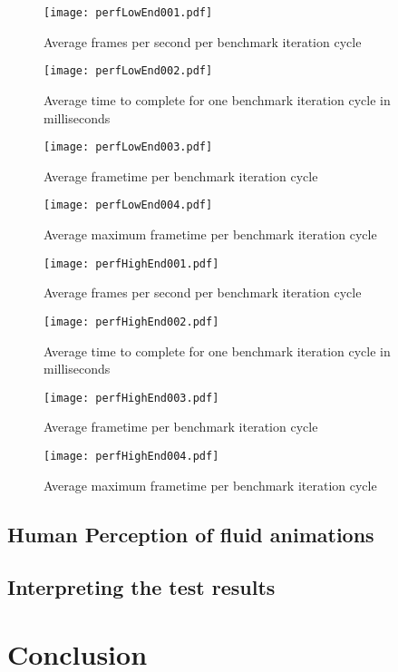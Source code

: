 \begin{figure}
\centering
\texttt{[image: perfLowEnd001.pdf]}
\caption{Average frames per second per benchmark iteration cycle}
\label{fig:perfLowEnd001}
\end{figure}

\begin{figure}
\centering
\texttt{[image: perfLowEnd002.pdf]}
\caption{Average time to complete for one benchmark iteration cycle in milliseconds}
\label{fig:perfLowEnd002}
\end{figure}

\begin{figure}
\centering
\texttt{[image: perfLowEnd003.pdf]}
\caption{Average frametime per benchmark iteration cycle}
\label{fig:perfLowEnd003}
\end{figure}

\begin{figure}
\centering
\texttt{[image: perfLowEnd004.pdf]}
\caption{Average maximum frametime per benchmark iteration cycle}
\label{fig:perfLowEnd004}
\end{figure}

\begin{figure}
\centering
\texttt{[image: perfHighEnd001.pdf]}
\caption{Average frames per second per benchmark iteration cycle}
\label{fig:perfHighEnd001}
\end{figure}

\begin{figure}
\centering
\texttt{[image: perfHighEnd002.pdf]}
\caption{Average time to complete for one benchmark iteration cycle in milliseconds}
\label{fig:perfHighEnd002}
\end{figure}

\begin{figure}
\centering
\texttt{[image: perfHighEnd003.pdf]}
\caption{Average frametime per benchmark iteration cycle}
\label{fig:perfHighEnd003}
\end{figure}

\begin{figure}
\centering
\texttt{[image: perfHighEnd004.pdf]}
\caption{Average maximum frametime per benchmark iteration cycle}
\label{fig:perfHighEnd004}
\end{figure}

\subsection{Human Perception of fluid animations}

\subsection{Interpreting the test results}

\section{Conclusion}

